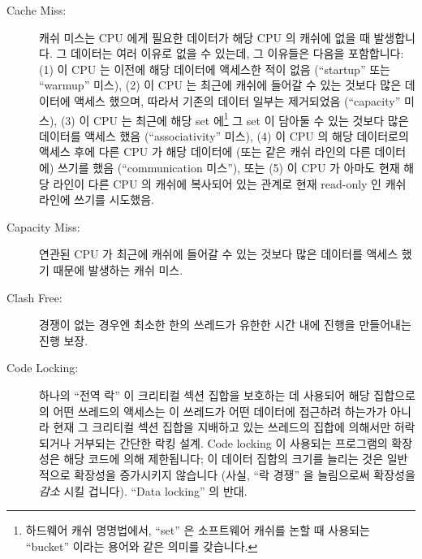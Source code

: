 \begin{description}
\fi

\item[Cache Miss:]
	캐쉬 미스는 CPU 에게 필요한 데이터가 해당 CPU 의 캐쉬에 없을 때
	발생합니다.
	그 데이터는 여러 이유로 없을 수 있는데, 그 이유들은 다음을 포함합니다:
	(1) 이 CPU 는 이전에 해당 데이터에 액세스한 적이 없음 (``startup'' 또는
	``warmup'' 미스),
	(2) 이 CPU 는 최근에 캐쉬에 들어갈 수 있는 것보다 많은 데이터에 액세스
	했으며, 따라서 기존의 데이터 일부는 제거되었음 (``capacity'' 미스),
	(3) 이 CPU 는 최근에 해당 set 에\footnote{
		하드웨어 캐쉬 명명법에서, ``set'' 은 소프트웨어 캐쉬를 논할 때
		사용되는 ``bucket'' 이라는 용어와 같은 의미를 갖습니다.}
	그 set 이 담아둘 수 있는 것보다 많은 데이터를 액세스 했음
	(``associativity'' 미스),
	(4) 이 CPU 의 해당 데이터로의 액세스 후에 다른 CPU 가 해당 데이터에
	(또는 같은 캐쉬 라인의 다른 데이터에) 쓰기를 했음  (``communication
	미스''), 또는
	(5) 이 CPU 가 아마도 현재 해당 라인이 다른 CPU 의 캐쉬에 복사되어 있는
	관계로 현재 read-only 인 캐쉬 라인에 쓰기를 시도했음.

\iffalse

\item[Cache Miss:]\index{Cache miss}
	A cache miss occurs when data needed by the CPU is not in
	that CPU's cache.
	The data might be missing because of a number of reasons,
	including:
	(1) this CPU has never accessed the data before
	(``startup'' or ``warmup'' miss),
	(2) this CPU has recently accessed more
	data than would fit in its cache, so that some of the older
	data had to be removed (``capacity'' miss),
	(3) this CPU
	has recently accessed more data in a given set\footnote{
		In hardware-cache terminology, the word ``set''
		is used in the same way that the word ``bucket''
		is used when discussing software caches.}
	than that set could hold (``associativity'' miss),
	(4) some other CPU has written to the data (or some other
	data in the same cache line) since this CPU has accessed it
	(``communication miss''), or
	(5) this CPU attempted to write to a cache line that is
	currently read-only, possibly due to that line being replicated
	in other CPUs' caches.

\fi

\item[Capacity Miss:]
	연관된 CPU 가 최근에 캐쉬에 들어갈 수 있는 것보다 많은 데이터를 액세스
	했기 때문에 발생하는 캐쉬 미스.
\item[Clash Free:]
	경쟁이 없는 경우엔 최소한 한의 쓰레드가 유한한 시간 내에 진행을
	만들어내는 진행 보장.
\item[Code Locking:]
	하나의 ``전역 락'' 이 크리티컬 섹션 집합을 보호하는 데 사용되어 해당
	집합으로의 어떤 쓰레드의 액세스는 이 쓰레드가 어떤 데이터에 접근하려
	하는가가 아니라 현재 그 크리티컬 섹션 집합을 지배하고 있는 쓰레드의
	집합에 의해서만 허락되거나 거부되는 간단한 락킹 설계.
	Code locking 이 사용되는 프로그램의 확장성은 해당 코드에 의해
	제한됩니다; 이 데이터 집합의 크기를 늘리는 것은 일반적으로 확장성을
	증가시키지 않습니다 (사실, ``락 경쟁'' 을 늘림으로써 확장성을
	\emph{감소} 시킬 겁니다).
	``Data locking'' 의 반대.


\end{description}
